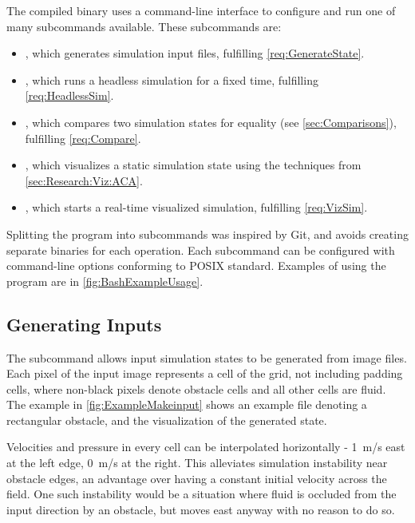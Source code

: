 The compiled binary uses a command-line interface to configure and run one of many subcommands available.
These subcommands are:\label{sec:DesignSubcommands}
\begin{itemize}
    \item {}, which generates simulation input files, fulfilling \cref{req:GenerateState}.
    \item {}, which runs a headless simulation for a fixed time, fulfilling \cref{req:HeadlessSim}.
    \item {}, which compares two simulation states for equality (see \cref{sec:Comparisons}), fulfilling \cref{req:Compare}.
    \item {}, which visualizes a static simulation state using the techniques from \cref{sec:Research:Viz:ACA}.
    \item {}, which starts a real-time visualized simulation, fulfilling \cref{req:VizSim}.
\end{itemize}
Splitting the program into subcommands was inspired by Git\cite{tool:Git}, and avoids creating separate binaries for each operation.
Each subcommand can be configured with command-line options conforming to POSIX standard\cite{IEEE2018UtilityConventions}.
Examples of using the program are in \cref{fig:BashExampleUsage}.


\subsection{Generating Inputs}
The  subcommand allows input simulation states to be generated from image files.
Each pixel of the input image represents a cell of the grid, not including padding cells, where non-black pixels denote obstacle cells and all other cells are fluid.
The example in \cref{fig:ExampleMakeinput} shows an example file denoting a rectangular obstacle, and the visualization of the generated state.


Velocities and pressure in every cell can be interpolated horizontally - \SI{1}{m/s} east at the left edge, \SI{0}{m/s} at the right.
This alleviates simulation instability near obstacle edges, an advantage over having a constant initial velocity across the field.
One such instability would be a situation where fluid is occluded from the input direction by an obstacle, but moves east anyway with no reason to do so.

